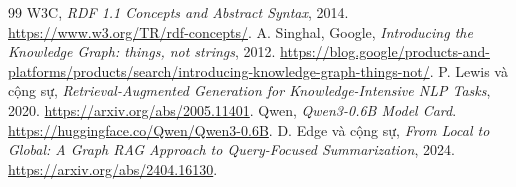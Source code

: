 \documentclass[12pt,a4paper]{report}
\begin{document}
\begin{thebibliography}{99}
 W3C, \textit{RDF 1.1 Concepts and Abstract Syntax}, 2014.
\url{https://www.w3.org/TR/rdf-concepts/}.
 A. Singhal, Google, \textit{Introducing the Knowledge Graph: things, not strings}, 2012.
\url{https://blog.google/products-and-platforms/products/search/introducing-knowledge-graph-things-not/}.
 P. Lewis và cộng sự, \textit{Retrieval-Augmented Generation for Knowledge-Intensive NLP Tasks}, 2020.
\url{https://arxiv.org/abs/2005.11401}.
 Qwen, \textit{Qwen3-0.6B Model Card}.
\url{https://huggingface.co/Qwen/Qwen3-0.6B}.
 D. Edge và cộng sự, \textit{From Local to Global: A Graph RAG Approach to Query-Focused Summarization}, 2024.
\url{https://arxiv.org/abs/2404.16130}.
\end{thebibliography}
\end{document}
